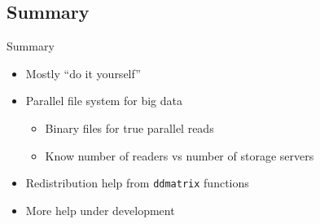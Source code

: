 \subsection{Summary}
\makesubcontentsslidessec


\begin{frame}
  \begin{block}{Summary}
    \begin{itemize}
    \item Mostly ``do it yourself''
    \item Parallel file system for big data
      \begin{itemize}
      \item Binary files for true parallel reads
      \item Know number of readers vs number of storage servers
      \end{itemize}
    \item Redistribution help from {\tt ddmatrix} functions
    \item More help under development
    \end{itemize}
  \end{block}
\end{frame}